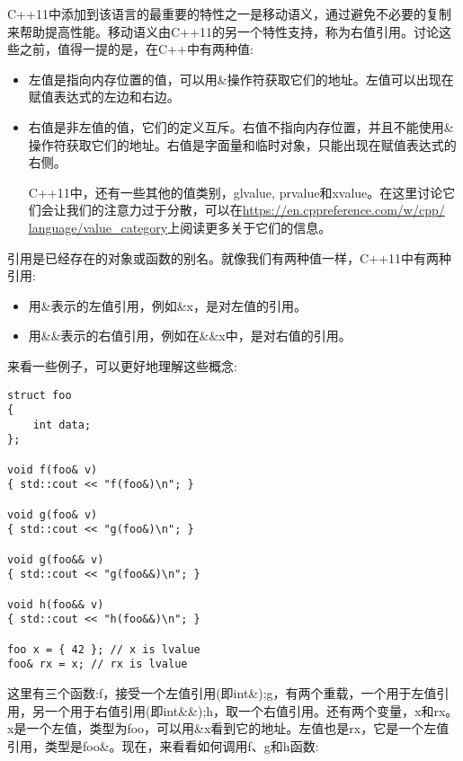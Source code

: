 C++11中添加到该语言的最重要的特性之一是移动语义，通过避免不必要的复制来帮助提高性能。移动语义由C++11的另一个特性支持，称为右值引用。讨论这些之前，值得一提的是，在C++中有两种值:

\begin{itemize}
\item
左值是指向内存位置的值，可以用\&操作符获取它们的地址。左值可以出现在赋值表达式的左边和右边。

\item
右值是非左值的值，它们的定义互斥。右值不指向内存位置，并且不能使用\&操作符获取它们的地址。右值是字面量和临时对象，只能出现在赋值表达式的右侧。

\begin{tcolorbox}[breakable,enhanced jigsaw,colback=blue!5!white,colframe=blue!75!black,title={Note}]
C++11中，还有一些其他的值类别，glvalue, prvalue和xvalue。在这里讨论它们会让我们的注意力过于分散，可以在\url{https://en.cppreference.com/w/cpp/ language/value_category}上阅读更多关于它们的信息。
\end{tcolorbox}

\end{itemize}

引用是已经存在的对象或函数的别名。就像我们有两种值一样，C++11中有两种引用:

\begin{itemize}
\item
用\&表示的左值引用，例如\&x，是对左值的引用。

\item
用\&\&表示的右值引用，例如在\&\&x中，是对右值的引用。
\end{itemize}

来看一些例子，可以更好地理解这些概念:

\begin{lstlisting}[style=styleCXX]
struct foo
{
	int data;
};

void f(foo& v)
{ std::cout << "f(foo&)\n"; }

void g(foo& v)
{ std::cout << "g(foo&)\n"; }

void g(foo&& v)
{ std::cout << "g(foo&&)\n"; }

void h(foo&& v)
{ std::cout << "h(foo&&)\n"; }

foo x = { 42 }; // x is lvalue
foo& rx = x; // rx is lvalue
\end{lstlisting}

这里有三个函数:f，接受一个左值引用(即int\&);g，有两个重载，一个用于左值引用，另一个用于右值引用(即int\&\&);h，取一个右值引用。还有两个变量，x和rx。x是一个左值，类型为foo，可以用\&x看到它的地址。左值也是rx，它是一个左值引用，类型是foo\&。现在，来看看如何调用f、g和h函数:

